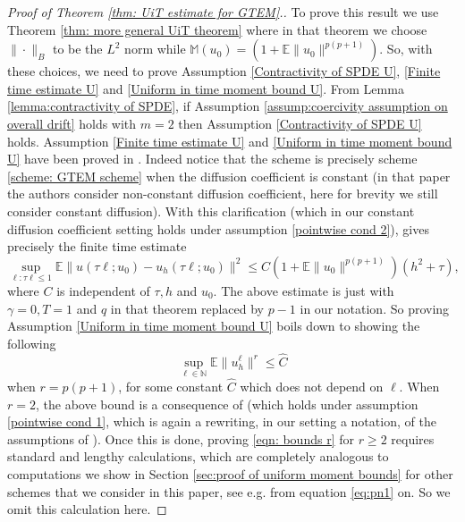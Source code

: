 \documentclass[reqno, 11pt]{amsart}
\theoremstyle{plain}
\theoremstyle{definition}
\theoremstyle{remark}
\numberwithin{equation}{section}
\numberwithin{theorem}{section}
\newcommand{\N}{\mathbb{N}}
\begin{document}
{\begin{proof}[Proof of Theorem \ref{thm: UiT estimate for GTEM}.]
To prove this result we use Theorem \ref{thm: more general UiT theorem} where in that theorem we choose  $\|\cdot \|_B$ to be  the $L^2$ norm  while  $\mathbb M(u_0) = (1+ \mathbb E \|u_0\|^{p(p+1)})$. So, with these choices,   we need to prove  Assumption \ref{Contractivity of SPDE U}, \ref{Finite time estimate U} and \ref{Uniform in time moment bound U}. From Lemma \ref{lemma:contractivity of SPDE}, if Assumption \ref{assump:coercivity assumption on overall drift} holds with $m=2$ then Assumption \ref{Contractivity of SPDE U} holds. Assumption \ref{Finite time estimate U} and \ref{Uniform in time moment bound U} have been proved in \cite{liu2025geometric}. Indeed notice that the scheme \cite[(3.11)]{liu2025geometric} is precisely scheme \eqref{scheme: GTEM scheme} when the diffusion coefficient is constant  (in that paper the authors consider non-constant diffusion coefficient, here for brevity we still consider constant diffusion). With this clarification\cite[Theorem 5.1]{liu2025geometric} (which in our constant diffusion coefficient setting holds under assumption \ref{pointwise cond 2}), gives precisely the finite time estimate 
$$
\sup_{\ell: \tau \ell \leq 1} \mathbb E\|u(\tau\ell; u_0) - u_{h}(\tau \ell; u_0) \|^2 \leq C (1+ \mathbb E \|u_0\|^{p(p+1)}) (h^2 + \tau), 
$$
where $C$ is independent of $\tau, h$ and $u_0$. 
The above estimate is just \cite[equation (5.5)]{liu2025geometric} with $\gamma=0, T=1$ and $q$ in that theorem replaced by $p-1$ in our notation. So  proving Assumption \ref{Uniform in time moment bound U} boils down to showing the following 
\begin{equation}\label{eqn: bounds r}
\sup_{\ell \in \N} \mathbb E \|u_h^\ell\|^{r} \leq \hat C
\end{equation}
when $r=p(p+1)$, for some constant $\hat C$ which does not depend on $\ell$. When $r=2$, the above bound is a consequence of \cite[Theorem 3.3]{liu2025geometric} (which holds under assumption \ref{pointwise cond 1}, which is again a rewriting, in our setting a notation, of the assumptions of  \cite[Theorem 3.3]{liu2025geometric}). Once this is done,  proving \eqref{eqn: bounds r} for $r\geq 2$ requires standard and lengthy calculations, which are completely analogous to computations we show in Section \ref{sec:proof of uniform moment bounds} for other schemes that we consider in this paper, see e.g. from equation \eqref{eq:pn1} on. So we omit this calculation here. 
    

\end{proof}}
\end{document}
